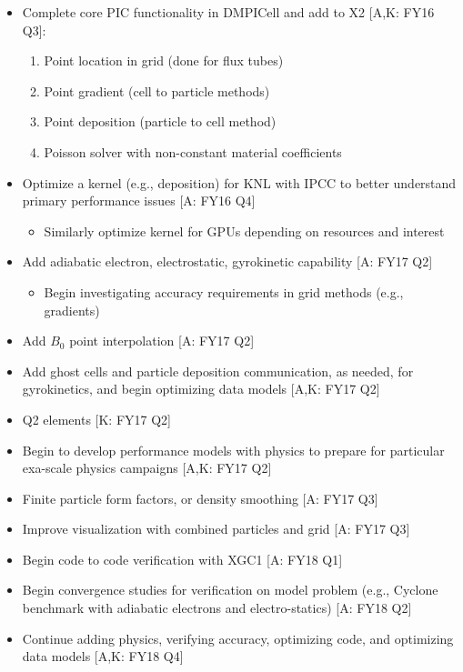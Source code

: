 \documentclass[review]{siamart}
\begin{document}
\begin{itemize}
\item Complete core PIC functionality in DMPICell and add to X2 [A,K: FY16 Q3]:
\begin{enumerate}
\item Point location in grid (done for flux tubes)
\item Point gradient (cell to particle methods)
\item Point deposition (particle to cell method)
\item Poisson solver with non-constant material coefficients 
\end{enumerate}
\item Optimize a kernel (e.g., deposition) for KNL with IPCC to better understand primary performance issues [A: FY16 Q4]
\begin{itemize}
\item Similarly optimize kernel for GPUs depending on resources and interest
\end{itemize}
\item Add adiabatic electron, electrostatic, gyrokinetic capability [A: FY17 Q2]
\begin{itemize}
\item Begin investigating accuracy requirements in grid methods (e.g., gradients) 
\end{itemize}
\item Add $B_0$ point interpolation [A: FY17 Q2]
\item Add ghost cells and particle deposition communication, as needed, for gyrokinetics, and begin optimizing data models [A,K: FY17 Q2]
\item Q2 elements [K: FY17 Q2]
\item Begin to develop performance models with physics to prepare for particular exa-scale physics campaigns [A,K: FY17 Q2]
\item Finite particle form factors, or density smoothing [A: FY17 Q3]
\item Improve visualization with combined particles and grid [A: FY17 Q3]
\item Begin code to code verification with XGC1 [A: FY18 Q1]
\item Begin convergence studies for verification on model problem (e.g., Cyclone benchmark with adiabatic electrons and electro-statics) [A: FY18 Q2]
\item Continue adding physics, verifying accuracy, optimizing code, and optimizing data models [A,K: FY18 Q4]
\end{itemize}
\pagebreak


 
\end{document}
